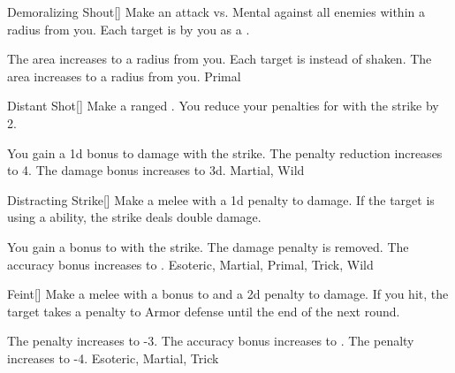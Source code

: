\lowercase{\hypertarget{maneuver:Demoralizing Shout}{}}\label{maneuver:Demoralizing Shout}
\hypertarget{maneuver:Demoralizing Shout}{}
\begin{freeability}{Demoralizing Shout}[]
Make an attack vs. Mental against all enemies within a \areasmall radius from you.
\hit Each target is  by you as a .

\rankline
{} The area increases to a \areamed radius from you.
 Each target is  instead of shaken.
 The area increases to a \areahuge radius from you.
 Primal
\end{freeability}
\vspace{0.25em}



\lowercase{\hypertarget{maneuver:Distant Shot}{}}\label{maneuver:Distant Shot}
\hypertarget{maneuver:Distant Shot}{}
\begin{freeability}{Distant Shot}[]
Make a ranged .
You reduce your penalties for  with the strike by 2.

\rankline
{} You gain a \plus1d bonus to damage with the strike.
 The penalty reduction increases to 4.
 The damage bonus increases to \plus3d.
 Martial, Wild
\end{freeability}
\vspace{0.25em}



\lowercase{\hypertarget{maneuver:Distracting Strike}{}}\label{maneuver:Distracting Strike}
\hypertarget{maneuver:Distracting Strike}{}
\begin{freeability}{Distracting Strike}[]
Make a melee  with a \minus1d penalty to damage.
If the target is using a  ability, the strike deals double damage.

\rankline
{} You gain a  bonus to  with the strike.
 The damage penalty is removed.
 The accuracy bonus increases to .
 Esoteric, Martial, Primal, Trick, Wild
\end{freeability}
\vspace{0.25em}



\lowercase{\hypertarget{maneuver:Feint}{}}\label{maneuver:Feint}
\hypertarget{maneuver:Feint}{}
\begin{freeability}{Feint}[]
Make a melee  with a  bonus to  and a \minus2d penalty to damage.
If you hit, the target takes a  penalty to Armor defense until the end of the next round.

\rankline
{} The penalty increases to -3.
 The accuracy bonus increases to .
 The penalty increases to -4.
 Esoteric, Martial, Trick
\end{freeability}
\vspace{0.25em}




